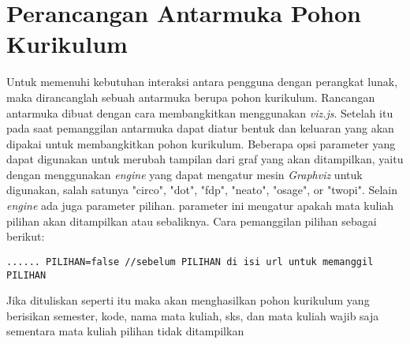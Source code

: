 \section{Perancangan Antarmuka Pohon Kurikulum}
\label{sec: Perancangan Antarmuka Pohon Kurikulum}
Untuk memenuhi kebutuhan interaksi antara pengguna dengan perangkat lunak, maka dirancanglah sebuah antarmuka berupa pohon kurikulum. Rancangan antarmuka dibuat dengan cara membangkitkan menggunakan \textit{viz.js}. Setelah itu pada saat pemanggilan antarmuka dapat diatur bentuk dan keluaran yang akan dipakai untuk membangkitkan pohon kurikulum. Beberapa opsi parameter yang dapat digunakan untuk merubah tampilan dari graf yang akan ditampilkan, yaitu dengan menggunakan \textit{engine} yang dapat mengatur mesin \textit{Graphviz} untuk digunakan, salah satunya "circo", "dot", "fdp", "neato", "osage", or "twopi". Selain \textit{engine} ada juga parameter pilihan. parameter ini mengatur apakah mata kuliah pilihan akan ditampilkan atau sebaliknya. Cara pemanggilan pilihan sebagai berikut:
\begin{lstlisting}
...... PILIHAN=false //sebelum PILIHAN di isi url untuk memanggil PILIHAN
\end{lstlisting}
Jika dituliskan seperti itu maka akan menghasilkan pohon kurikulum yang berisikan semester, kode, nama mata kuliah, sks, dan mata kuliah wajib saja sementara mata kuliah pilihan tidak ditampilkan

